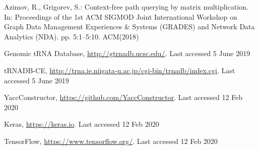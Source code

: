 \documentclass[runningheads]{llncs}
\begin{document}
\begin{thebibliography}{14}
Azimov, R., Grigorev, S.: Context-free path querying by matrix multiplication. In: Proceedings of the 1st ACM SIGMOD Joint International Workshop on Graph Data Management Experiences \& Systems (GRADES) and Network Data Analytics (NDA). pp. 5:1--5:10. ACM(2018)


Genomic tRNA Database, \url{http://gtrnadb.ucsc.edu/}. Last accessed 5 June 2019

tRNADB-CE, \url{http://trna.ie.niigata-u.ac.jp/cgi-bin/trnadb/index.cgi}. Last accessed 5 June 2019

YaccConstructor, \url{https://github.com/YaccConstructor}. Last accessed 12 Feb 2020

Keras, \url{https://keras.io}. Last accessed 12 Feb 2020

TensorFlow, \url{https://www.tensorflow.org/}. Last accessed 12 Feb 2020

\end{thebibliography}
\end{document}
